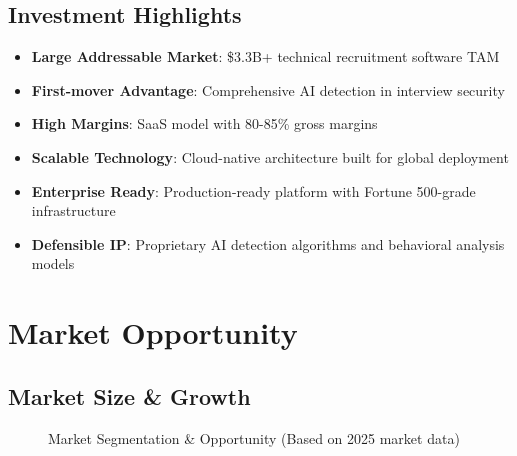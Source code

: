 \documentclass[11pt,letterpaper]{article}
\begin{document}
\subsection{Investment Highlights}

\begin{itemize}[noitemsep]
    \item \textbf{Large Addressable Market}: \$3.3B+ technical recruitment software TAM\cite{coherent2024}
    \item \textbf{First-mover Advantage}: Comprehensive AI detection in interview security
    \item \textbf{High Margins}: SaaS model with 80-85\% gross margins
    \item \textbf{Scalable Technology}: Cloud-native architecture built for global deployment
    \item \textbf{Enterprise Ready}: Production-ready platform with Fortune 500-grade infrastructure
    \item \textbf{Defensible IP}: Proprietary AI detection algorithms and behavioral analysis models
\end{itemize}


\section{Market Opportunity}

\subsection{Market Size \& Growth}

\begin{figure}[H]
\centering
{}
\caption{Market Segmentation \& Opportunity (Based on 2025 market data\cite{coherent2024,mordor2025})}
\end{figure}
\end{document}
